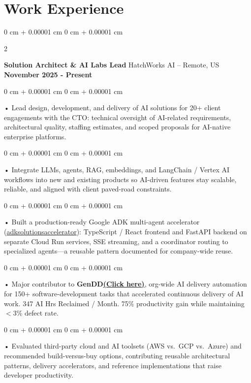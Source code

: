 \documentclass[10pt, letterpaper]{article}
\newenvironment{onecolentry}{
    \begin{adjustwidth}{
        0 cm + 0.00001 cm
    }{
        0 cm + 0.00001 cm
    }
}{
    \end{adjustwidth}
} %
\newenvironment{twocolentry}[2][]{
    \onecolentry
    \def\secondColumn{#2}
    \setcolumnwidth{\fill, 4.5 cm}
    \begin{paracol}{2}
}{
    \switchcolumn \raggedleft \secondColumn
    \end{paracol}
    \endonecolentry
} %
\begin{document}
    \vspace{0.3cm}
    \section{Work Experience}
        \vspace{0.1cm}

        \begin{twocolentry}{
            \textbf{November 2025 - Present}
        }
            \textbf{Solution Architect \& AI Labs Lead} HatchWorks AI -- Remote, US\end{twocolentry}

        \begin{onecolentry}
             • Lead design, development, and delivery of AI solutions for 20+ client engagements with the CTO: technical oversight of AI-related requirements, architectural quality, staffing estimates, and scoped proposals for AI-native enterprise platforms.
        \end{onecolentry}
        \begin{onecolentry}
             • Integrate LLMs, agents, RAG, embeddings, and LangChain / Vertex AI workflows into new and existing products so AI-driven features stay scalable, reliable, and aligned with client paved-road constraints.
        \end{onecolentry}
        \begin{onecolentry}
             • Built a production-ready Google ADK multi-agent accelerator (\href{https://github.com/sreenikethaathreya-hw/adksolutionsaccelerator}{adksolutionsaccelerator}): TypeScript / React frontend and FastAPI backend on separate Cloud Run services, SSE streaming, and a coordinator routing to specialized agents---a reusable pattern documented for company-wide reuse.
        \end{onecolentry}
        \begin{onecolentry}
             • Major contributor to \textbf{GenDD}\href{https://hatchworks.com/generative-driven-development/}{\textbf{(Click here)}}, org-wide AI delivery automation for 150+ software-development tasks that accelerated continuous delivery of AI work. 347 AI Hrs Reclaimed / Month. 75\% productivity gain while maintaining $<$3\% defect rate.
        \end{onecolentry}
        \begin{onecolentry}
             • Evaluated third-party cloud and AI toolsets (AWS vs.\ GCP vs.\ Azure) and recommended build-versus-buy options, contributing reusable architectural patterns, delivery accelerators, and reference implementations that raise developer productivity.
        \end{onecolentry}
\end{document}

